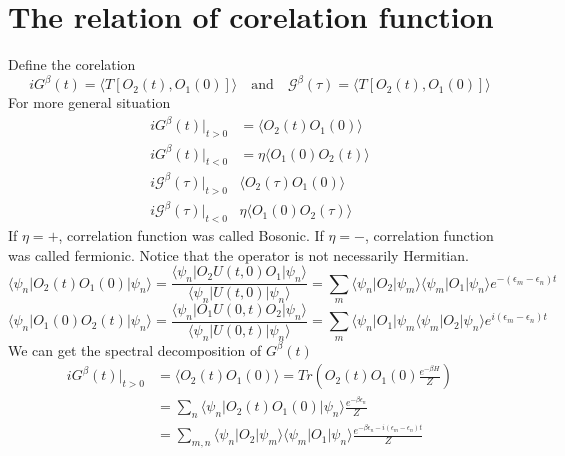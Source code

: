 \documentclass[a4paper,11pt]{article}
\begin{document}
\section{The relation of corelation function}
Define the corelation
\begin{equation*}
  iG^\beta(t)=\langle T[O_2(t),O_1(0)]\rangle\quad\text{and}\quad\mathcal{G}^\beta(\tau)=\langle T[O_2(t),O_1(0)]\rangle
\end{equation*}
For more general situation
\begin{equation*}
  \begin{split}
     iG^\beta(t)|_{t>0} & =\langle O_2(t)O_1(0)\rangle \\
     iG^\beta(t)|_{t<0} & =\eta\langle O_1(0)O_2(t)\rangle \\
     i\mathcal{G}^\beta(\tau)|_{t>0}  & \langle O_2(\tau)O_1(0)\rangle \\
     i\mathcal{G}^\beta(\tau)|_{t<0}  & \eta\langle O_1(0)O_2(\tau)\rangle
  \end{split}
\end{equation*}
If $\eta=+$, correlation function was called Bosonic. If $\eta=-$, correlation function was called fermionic. Notice that the operator is not necessarily Hermitian.
\begin{equation*}
  \langle\psi_n|O_2(t)O_1(0)|\psi_n\rangle=\frac{\langle\psi_n|O_2U(t,0)O_1|\psi_n\rangle}{\langle\psi_n|U(t,0)|\psi_n\rangle}=\sum_{m}\langle\psi_n|O_2|\psi_m\rangle\langle\psi_m|O_1|\psi_n\rangle e^{-(\epsilon_m-\epsilon_n)t}
\end{equation*}
\begin{equation*}
  \langle\psi_n|O_1(0)O_2(t)|\psi_n\rangle=\frac{\langle\psi_n|O_1U(0,t)O_2|\psi_n\rangle}{\langle\psi_n|U(0,t)|\psi_n\rangle}=\sum_{m}\langle\psi_n|O_1|\psi_m\langle\psi_m|O_2|\psi_n\rangle e^{i(\epsilon_m-\epsilon_n)t}
\end{equation*}
We can get the spectral decomposition of $G^{\beta}(t)$
\begin{equation*}
  \begin{split}
     iG^\beta(t)|_{t>0}&=\langle O_2(t)O_1(0)\rangle=Tr\left(O_2(t)O_1(0)\frac{e^{-\beta H}}{Z}\right)\\
       &=\sum_{n}\langle\psi_n|O_2(t)O_1(0)|\psi_n\rangle\frac{e^{-\beta\epsilon_n}}{Z}\\
       &=\sum_{m,n}\langle\psi_n|O_2|\psi_m\rangle\langle\psi_m|O_1|\psi_n\rangle\frac{e^{-\beta\epsilon_n-i(\epsilon_m-\epsilon_n)t}}{Z}
  \end{split}
\end{equation*}
\end{document}
